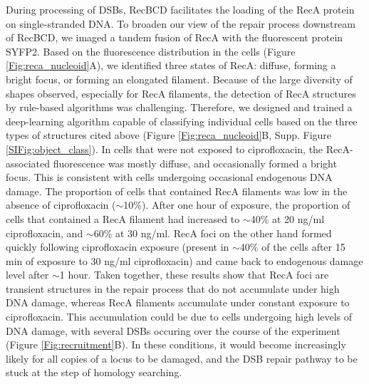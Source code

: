 During processing of DSBs, RecBCD facilitates the loading of the RecA protein on single-stranded DNA. To broaden our view of the repair process downstream of RecBCD, we imaged a tandem fusion of RecA with the fluorescent protein SYFP2.\cite{Wiktor2021} Based on the fluorescence distribution in the cells (Figure \ref{Fig:reca_nucleoid}A), we identified three states of RecA: diffuse, forming a bright focus, or forming an elongated filament. Because of the large diversity of shapes observed, especially for RecA filaments, the detection of RecA structures by rule-based algorithms was challenging. Therefore, we designed and trained a deep-learning algorithm capable of classifying individual cells based on the three types of structures cited above (Figure \ref{Fig:reca_nucleoid}B, Supp. Figure \ref{SIFig:object_class}). In cells that were not exposed to ciprofloxacin, the RecA-associated fluorescence was mostly diffuse, and occasionally formed a bright focus. This is consistent with cells undergoing occasional endogenous DNA damage. The proportion of cells that contained RecA filaments was low in the absence of ciprofloxacin ($\sim$10\%). After one hour of exposure, the proportion of cells that contained a RecA filament had increased to $\sim$40\% at 20 ng/ml ciprofloxacin, and $\sim$60\% at 30 ng/ml. RecA foci on the other hand formed quickly following ciprofloxacin exposure (present in $\sim$40\% of the cells after 15 min of exposure to 30 ng/ml ciprofloxacin) and came back to endogenous damage level after $\sim$1 hour. Taken together, these results show that RecA foci are transient structures in the repair process that do not accumulate under high DNA damage, whereas RecA filaments accumulate under constant exposure to ciprofloxacin. This accumulation could be due to cells undergoing high levels of DNA damage, with several DSBs occuring over the course of the experiment (Figure \ref{Fig:recruitment}B). In these conditions, it would become increasingly likely for all copies of a locus to be damaged, and the DSB repair pathway to be stuck at the step of homology searching.


